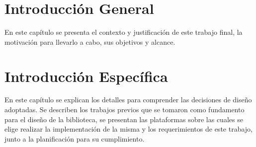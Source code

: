 \documentclass[
11pt, %
spanish,
singlespacing, %
parskip, %
headsepline, %
]{MastersDoctoralThesis} %
\begin{document}

\newcommand{\titulo}[1]{\bigskip \noindent\textbf{#1} \\} %
\newcommand{\subtitulo}[1]{\bigskip \noindent\textit{#1} \\} %



\chapter{Introducción General}
\label{ChapterIntroGral}

En este capítulo se presenta el contexto y justificación de este trabajo final, la motivación para llevarlo a cabo, sus objetivos y alcance.





\chapter{Introducción Específica}
\label{ChapterIntroEsp}

En este capítulo se explican los detalles para comprender las decisiones de diseño adoptadas. Se describen los trabajos previos que se tomaron como fundamento para el diseño de la biblioteca, se presentan las plataformas sobre las cuales se elige realizar la implementación de la misma y los requerimientos de este trabajo, junto a la planificación para su cumplimiento.


 
 
 
 
\end{document}
